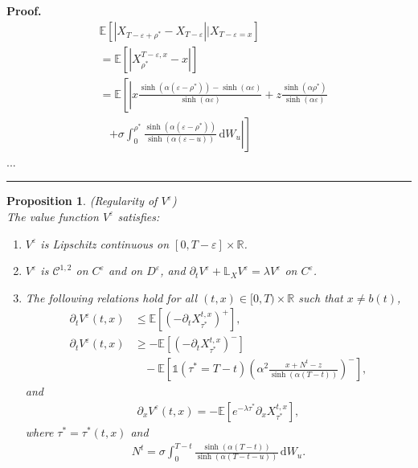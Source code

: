 \documentclass{tufte-handout}
\newcommand{\E}{\mathbb{E}} %
\newcommand{\R}{\mathbb{R}} %
\newcommand{\dif}{\mathrm{d}}
\newtheorem{pr}{Proposition}
\newenvironment{pf}[1][Proof]{\textbf{#1.} }{\ \rule{0.5em}{0.5em}}
\begin{document}
\begin{pf}
\begin{align*}
		&\E\left[\left|X_{T - \varepsilon + \rho^*} - X_{T - \varepsilon}\right| \Big | X_{T - \varepsilon = x}\right] \\
		&= \E\left[\left|X_{\rho^*}^{T - \varepsilon, x} - x\right|\right] \\
		&= \E\left[\left|x\frac{\sinh(\alpha (\varepsilon - \rho^*)) - \sinh(\alpha \varepsilon)}{\sinh(\alpha \varepsilon)} + z\frac{\sinh(\alpha \rho^*)}{\sinh(\alpha \varepsilon)}\right.\right. \\
		&\ \ \ \ \left.\left.+ \sigma\int_{0}^{\rho^*} \frac{\sinh(\alpha (\varepsilon - \rho^*))}{\sinh(\alpha (\varepsilon - u))}\,\mathrm{d}W_u\right|\right]
		\end{align*}
		...
	\end{pf}
	
	
	
	\begin{pr}(Regularity of $V^\varepsilon$)\label{pr:V^eps_regularity}\\
		The value function $V^\varepsilon$ satisfies:
		\begin{enumerate}[label=(\roman{*}), ref=(\textit{\roman{*}})]
			\item \label{pr:V^eps_Lcontinuous} $V^\varepsilon$ is Lipschitz continuous on $[0, T - \varepsilon]\times\R$. 
			\item \label{pr:V^eps_C^12onC} $V^\varepsilon$ is $\mathcal{C}^{1,2}$ on $C^\varepsilon$ and on $D^\varepsilon$, and $\partial_tV^\varepsilon + \mathbb{L}_{X}V^\varepsilon = \lambda V^\varepsilon$ on $C^\varepsilon$. 
			\item \label{pr:V^eps_x-V^eps_t} The following relations hold for all $(t, x) \in [0, T)\times\R$ such that $x\neq b(t)$,
			\begin{align}
			\partial_t V^\varepsilon(t, x) &\leq \E\left[\left(-\partial_t X_{\tau^*}^{t, x}\right)^+\right], \label{eq:V^epst_up} \\		
			\partial_t V^\varepsilon(t, x) &\geq - \E\left[\left(-\partial_t X_{\tau^*}^{t, x}\right)^-\right] \nonumber \\
			&\ \ \ \ - \E\left[\mathbb{1}(\tau^* = T - t)\left(\alpha^2\frac{x + N^t - z}{\sinh(\alpha (T - t))}\right)^-\right], \label{eq:V^epst_low}
			\end{align}
			and
			\begin{align}\label{eq:V^eps_x}
			\partial_xV^\varepsilon(t, x) = -\E\left[e^{-\lambda\tau^*}\partial_x X_{\tau^*}^{t, x}\right],
			\end{align} 
			where $\tau^* = \tau^*(t, x)$ and
			\begin{align}\label{eq:N^eps^t}
			N^t = \sigma\int_{0}^{T - t} \frac{\sinh(\alpha (T - t))}{\sinh(\alpha (T - t - u))}\,\mathrm{d}W_u. 
			\end{align} 			
		\end{enumerate}
	\end{pr}
	
\end{document}
